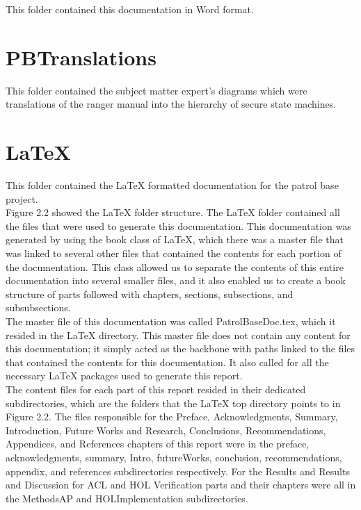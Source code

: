 This folder contained this documentation in Word format.

\section{PBTranslations}
\label{sec:pbtranslations}

This folder contained the subject matter expert's diagrams which were translations of the ranger manual
into the hierarchy of secure state machines.

\section{LaTeX}
\label{sec:latex}

This folder contained the LaTeX formatted documentation for the patrol base project.\\

Figure 2.2 showed the LaTeX folder structure. The LaTeX folder contained all the files that were used to generate this documentation. This documentation was generated by using the book class of LaTeX, which there was a master file that was linked to several other files that contained the contents for each portion of the documentation. This class allowed us to separate the contents of this entire documentation into several smaller files, and it also enabled us to create a book structure of parts followed with chapters, sections, subsections, and subsubsections. \\

The master file of this documentation was called PatrolBaseDoc.tex, which it resided in the LaTeX directory. This master file does not contain any content for this documentation; it simply acted as the backbone with paths linked to the files that contained the contents for this documentation. It also called for all the necessary LaTeX packages used to generate this report. \\

The content files for each part of this report resided in their dedicated subdirectories, which are the folders that the LaTeX top directory points to in Figure 2.2. The files responsible for the Preface, Acknowledgments, Summary, Introduction, Future Works and Research, Conclusions, Recommendations, Appendices, and References chapters of this report were in the preface, acknowledgments, summary, Intro, futureWorks, conclusion, recommendations, appendix, and references subdirectories respectively. For the Results and Results and Discussion for ACL and HOL Verification parts and their chapters were all in the MethodsAP and HOLImplementation subdirectories.\\

